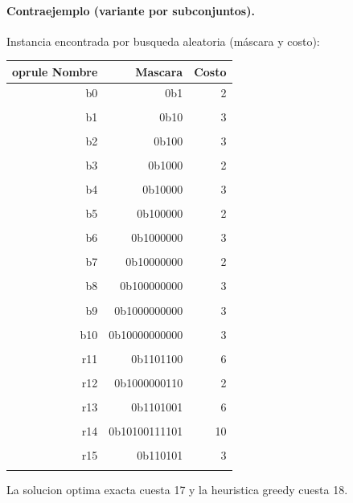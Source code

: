 \paragraph{Contraejemplo (variante por subconjuntos).} Instancia encontrada por busqueda aleatoria (máscara y costo):

\begin{tabular}{rrr}
    oprule
Nombre & Mascara & Costo \\
\midrule
b0 & 0b1 & 2 \\\\
b1 & 0b10 & 3 \\\\
b2 & 0b100 & 3 \\\\
b3 & 0b1000 & 2 \\\\
b4 & 0b10000 & 3 \\\\
b5 & 0b100000 & 2 \\\\
b6 & 0b1000000 & 3 \\\\
b7 & 0b10000000 & 2 \\\\
b8 & 0b100000000 & 3 \\\\
b9 & 0b1000000000 & 3 \\\\
b10 & 0b10000000000 & 3 \\\\
r11 & 0b1101100 & 6 \\\\
r12 & 0b1000000110 & 2 \\\\
r13 & 0b1101001 & 6 \\\\
r14 & 0b10100111101 & 10 \\\\
r15 & 0b110101 & 3 \\\\
\bottomrule
\end{tabular}

La solucion optima exacta cuesta 17 y la heuristica greedy cuesta 18.
